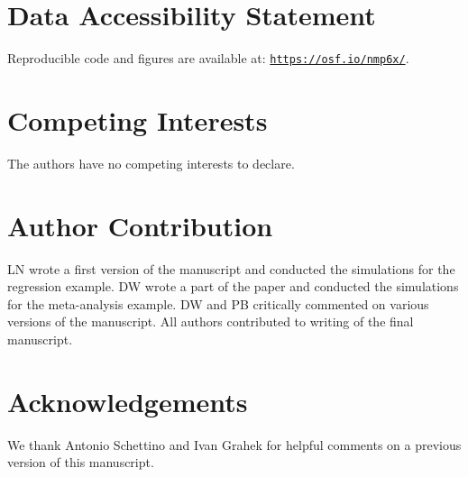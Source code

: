 \documentclass[a4paper,man,natbib,floatsintext,donotrepeattitle]{apa6}
\begin{document}
\section{Data Accessibility Statement}

Reproducible code and figures are available at: \href{https://osf.io/nmp6x/}{\nolinkurl{https://osf.io/nmp6x/}}.

\section{Competing Interests}

The authors have no competing interests to declare.

\section{Author Contribution}

LN wrote a first version of the manuscript and conducted the simulations for the regression example. DW wrote a part of the paper and conducted the simulations for the meta-analysis example. DW and PB critically commented on various versions of the manuscript. All authors contributed to writing of the final manuscript.

\section{Acknowledgements}

We thank Antonio Schettino and Ivan Grahek for helpful comments on a previous version of this manuscript.



  
\end{document}
